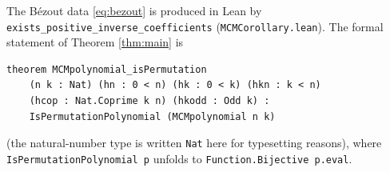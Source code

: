 \documentclass[11pt,a4paper]{article}
\theoremstyle{definition}
\begin{document}
\medskip
\noindent
The Bézout data \eqref{eq:bezout} is produced in Lean by
\texttt{exists\_positive\_inverse\_coefficients}
(\texttt{MCMCorollary.lean}).  The formal statement of Theorem \ref{thm:main} is
\begin{verbatim}
theorem MCMpolynomial_isPermutation
    (n k : Nat) (hn : 0 < n) (hk : 0 < k) (hkn : k < n)
    (hcop : Nat.Coprime k n) (hkodd : Odd k) :
    IsPermutationPolynomial (MCMpolynomial n k)
\end{verbatim}
(the natural-number type is written \texttt{Nat} here for typesetting reasons),
where \texttt{IsPermutationPolynomial p} unfolds to \texttt{Function.Bijective p.eval}.
\end{document}
